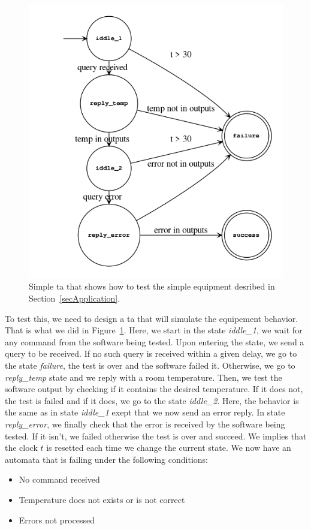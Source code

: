 \documentclass[12pt]{article}
\theoremstyle{definition}
\theoremstyle{definition}
\theoremstyle{remark}
\begin{document}
\begin{figure}
    \centering
    \includegraphics[scale=0.7]{ta_serial_equipment.png}
    \caption{Simple \gls{ta} that shows how to test the simple equipment desribed in Section~\ref{secApplication}.}
    \label{fig:ta_serial_equipment}
\end{figure}

To test this, we need to design a \gls{ta} that will simulate the equipement behavior. That is what we did in Figure~\ref{fig:ta_serial_equipment}. Here, we start in the state \textit{iddle\_1}, we wait for any command from the software being tested. Upon entering the state, we send a query to be received. If no such query is received within a given delay, we go to the state \textit{failure}, the test is over and the software failed it. Otherwise, we go to \textit{reply\_temp} state and we reply with a room temperature. Then, we test the software output by checking if it contains the desired temperature. If it does not, the test is failed and if it does, we go to the state \textit{iddle\_2}. Here, the behavior is the same as in state \textit{iddle\_1} exept that we now send an error reply. In state \textit{reply\_error}, we finally check that the error is received by the software being tested. If it isn't, we failed otherwise the test is over and succeed. We implies that the clock $t$ is resetted each time we change the current state. We now have an automata that is failing under the following conditions:
\begin{itemize}
\item No command received
\item Temperature does not exists or is not correct
\item Errors not processed
\end{itemize}
\end{document}
